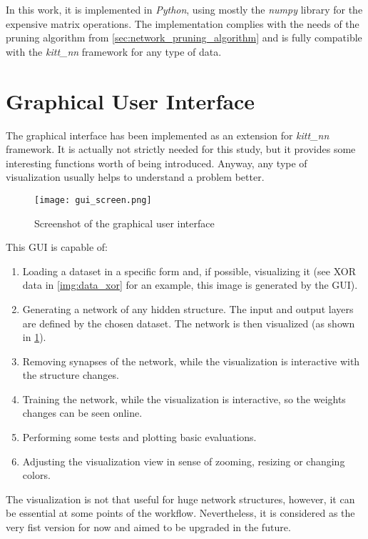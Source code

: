 In this work, it is implemented in \textit{Python}, using mostly the \textit{numpy} library for the expensive matrix operations. The implementation complies with the needs of the pruning algorithm from \cref{sec:network_pruning_algorithm} and is fully compatible with the \textit{kitt\_nn} framework for any type of data.

\section{Graphical User Interface} \label{sec:gui}
The graphical interface has been implemented as an extension for \textit{kitt\_nn} framework. It is actually not strictly needed for this study, but it provides some interesting functions worth of being introduced. Anyway, any type of visualization usually helps to understand a problem better.

\begin{figure}[H]
  \centering
  \texttt{[image: gui\_screen.png]}
  \caption{Screenshot of the graphical user interface}
  \label{img:gui_screen}
\end{figure}

This GUI is capable of:
\begin{enumerate}
\item Loading a dataset in a specific form and, if possible, visualizing it (see XOR data in \cref{img:data_xor} for an example, this image is generated by the GUI).
\item Generating a network of any hidden structure. The input and output layers are defined by the chosen dataset. The network is then visualized (as shown in \cref{img:gui_screen}).
\item Removing synapses of the network, while the visualization is interactive with the structure changes.
\item Training the network, while the visualization is interactive, so the weights changes can be seen online.
\item Performing some tests and plotting basic evaluations.
\item Adjusting the visualization view in sense of zooming, resizing or changing colors.
\end{enumerate}

The visualization is not that useful for huge network structures, however, it can be essential at some points of the workflow. Nevertheless, it is considered as the very fist version for now and aimed to be upgraded in the future.

